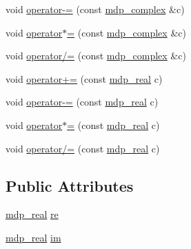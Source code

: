 \begin{DoxyCompactItemize}
\item 
void \hyperlink{classmdp__complex_a1eac5dee207c0bb4cfafa7f02311e819}{operator-\/=} (const \hyperlink{classmdp__complex}{mdp\_\-complex} \&c)
\item 
void \hyperlink{classmdp__complex_a66c98af6209f0a424413f08f75626b61}{operator$\ast$=} (const \hyperlink{classmdp__complex}{mdp\_\-complex} \&c)
\item 
void \hyperlink{classmdp__complex_a0dc8af0f39405418b2dacde050e10e5f}{operator/=} (const \hyperlink{classmdp__complex}{mdp\_\-complex} \&c)
\item 
void \hyperlink{classmdp__complex_aead1214077dc876c3f674e5fcd9717a5}{operator+=} (const \hyperlink{mdp__global__vars_8h_a049e4c1d4e74d644878a42f9909463e4}{mdp\_\-real} c)
\item 
void \hyperlink{classmdp__complex_a5388821dab285a814eef49281c3a69e4}{operator-\/=} (const \hyperlink{mdp__global__vars_8h_a049e4c1d4e74d644878a42f9909463e4}{mdp\_\-real} c)
\item 
void \hyperlink{classmdp__complex_af073e0a4d5e1dd7495797b42312d35cb}{operator$\ast$=} (const \hyperlink{mdp__global__vars_8h_a049e4c1d4e74d644878a42f9909463e4}{mdp\_\-real} c)
\item 
void \hyperlink{classmdp__complex_aa040dd29ac7484eb770f940a4761c435}{operator/=} (const \hyperlink{mdp__global__vars_8h_a049e4c1d4e74d644878a42f9909463e4}{mdp\_\-real} c)
\end{DoxyCompactItemize}
\subsection*{Public Attributes}
\begin{DoxyCompactItemize}
\item 
\hyperlink{mdp__global__vars_8h_a049e4c1d4e74d644878a42f9909463e4}{mdp\_\-real} \hyperlink{classmdp__complex_abd6f1624347c6acca19f089047c1a995}{re}
\item 
\hyperlink{mdp__global__vars_8h_a049e4c1d4e74d644878a42f9909463e4}{mdp\_\-real} \hyperlink{classmdp__complex_ab1d9712d92fea8db3d65ccfdee49adaa}{im}
\end{DoxyCompactItemize}
